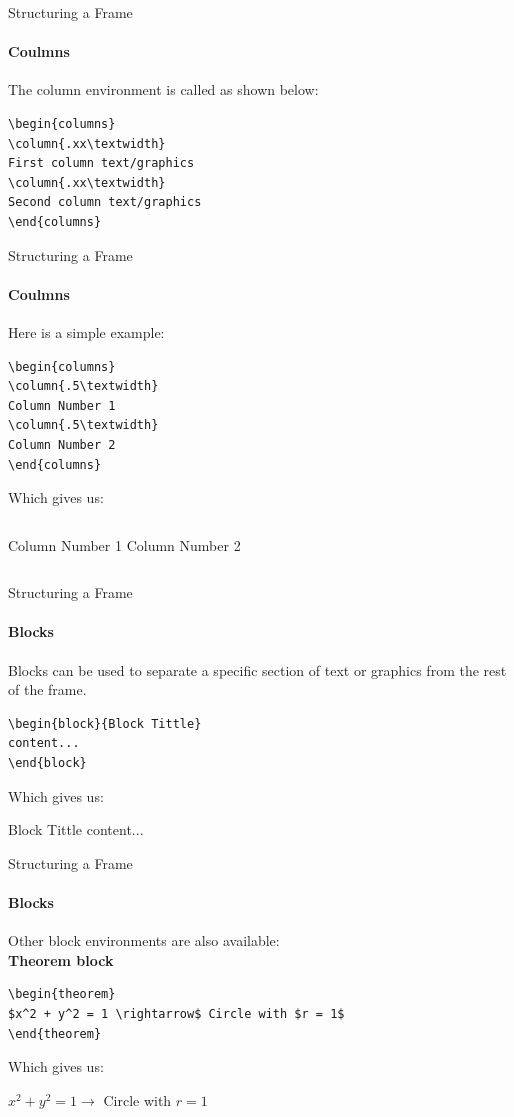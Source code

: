\documentclass{bredelebeamer}
\begin{document}
\begin{frame}[fragile]{Structuring a Frame}\framesubtitle{Coulmns}
The column environment is called as shown below:
\begin{center}
\begin{verbatim}
\begin{columns}
\column{.xx\textwidth}
First column text/graphics
\column{.xx\textwidth}
Second column text/graphics
\end{columns}
\end{verbatim}
\end{center}
\end{frame}

\begin{frame}[fragile]{Structuring a Frame}\framesubtitle{Coulmns}
Here is a simple example:
\begin{verbatim}
\begin{columns}
\column{.5\textwidth}
Column Number 1
\column{.5\textwidth}
Column Number 2
\end{columns}
\end{verbatim}
\alert{Which gives us}:\\
\begin{columns}
Column Number 1
Column Number 2
\end{columns}	
\end{frame}

\begin{frame}[fragile]{Structuring a Frame}\framesubtitle{Blocks}
Blocks can be used to separate a specific section of text or graphics
from the rest of the frame.

\begin{center}
\begin{verbatim}
\begin{block}{Block Tittle}
content...
\end{block}
\end{verbatim}
\end{center}
\alert{Which gives us}:\\
\begin{block}{Block Tittle}
content...
\end{block}
\end{frame}


\begin{frame}[fragile]{Structuring a Frame}\framesubtitle{Blocks}
Other block environments are also available:\\
\textbf{Theorem block}	
\begin{center}
\begin{verbatim}
\begin{theorem}
$x^2 + y^2 = 1 \rightarrow$ Circle with $r = 1$
\end{theorem}
\end{verbatim}
\end{center}
\alert{Which gives us}:\\
\begin{theorem}
$x^2 + y^2 = 1 \rightarrow$ Circle with $r = 1$
\end{theorem}
\end{frame}
\end{document}
